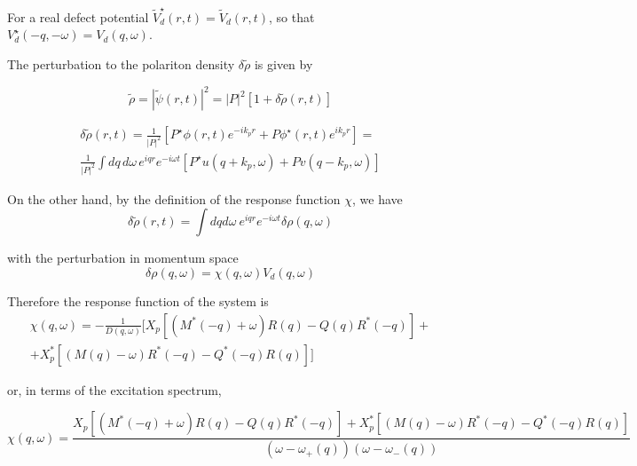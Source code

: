 \documentclass[a4paper,prb,10pt,aps,twocolumn]{revtex4-1}
\begin{document}
For a real defect potential $\tilde{V}_{d}^{\star}(r,t)=\tilde{V}_{d}(r,t)$, so that
$V_{d}^{\star}(-q,-\omega)=V_{d}(q,\omega)$.

The perturbation to the polariton density $\delta \tilde{\rho}$ is
given by

\begin{equation}
  \label{eq:44}
\tilde{\rho}=\left|\tilde{\psi}(r,t)\right|^{2}=\left|P\right|^{2}\left[1+\delta\tilde{\rho}(r,t)\right] 
\end{equation}


\begin{multline}
  \label{eq:109}
\delta\tilde{\rho}(r,t)=\frac{1}{\vert P\vert^{2}}\left[P^{\star}\phi(r,t)e^{-ik_{p}r}+P\phi^{\star}(r,t)e^{ik_{p}r}\right]=\\
\frac{1}{\vert P\vert^{2}}\int dq\, d\omega\, e^{iqr}e^{-i\omega t}\left[P^{\star}u(q+k_{p},\omega)+Pv(q-k_{p},\omega)\right]    
\end{multline}




On the other hand, by the definition of the response function $\chi$, we have
\begin{equation}
  \label{eq:46}
  \delta\tilde{\rho}(r,t)=\int dqd\omega\: e^{iqr}e^{-i\omega t}\delta\rho(q,\omega)
\end{equation}


with the perturbation in momentum space
\begin{equation}
  \label{eq:47}
   \delta\rho(q,\omega)=\chi(q,\omega)V_{d}(q,\omega)
\end{equation}


Therefore the response function of the system is
\begin{multline}
  \label{eq:110}
\chi(q,\omega)=-\frac{1}{D(q,\omega)}\Bigg[ X_{p}\left[\left(M^{*}(-q)+\omega\right)R(q)-Q(q)R^{*}(-q)\right]+\\+X_{p}^{*}\left[\left(M(q)-\omega\right)R^{*}(-q)-Q^{*}(-q)R(q)\right]\Bigg]
\end{multline}


or, in terms of the excitation spectrum,
\begin{widetext}
\begin{equation}
  \label{eq:49}
\chi(q,\omega)=\frac{X_{p}\left[\left(M^{*}(-q)+\omega\right)R(q)-Q(q)R^{*}(-q)\right]+X_{p}^{*}\left[\left(M(q)-\omega\right)R^{*}(-q)-Q^{*}(-q)R(q)\right]}{\left(\omega-\omega_{+}(q)\right)\left(\omega-\omega_{-}(q)\right)}  
\end{equation}
\end{widetext}
\end{document}

